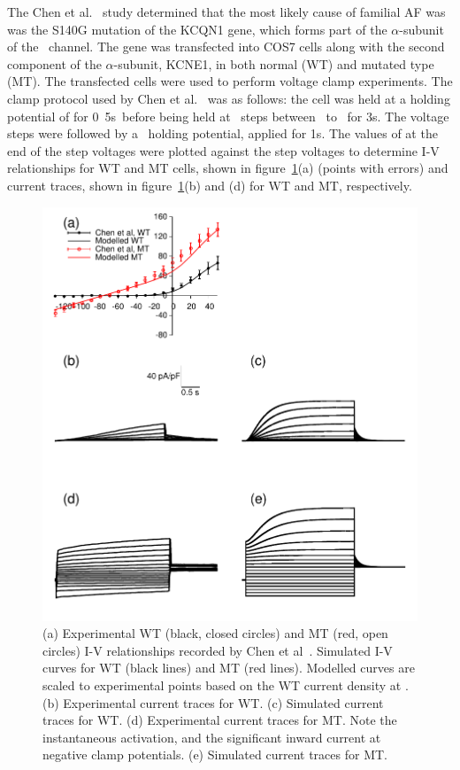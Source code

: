 The Chen et al.~\cite{Chen2003} study determined that the most likely cause of
familial AF was was the S140G mutation of the KCQN1 gene, which forms part of
the $\alpha$-subunit of the \ channel.
The gene was transfected into COS7 cells along with the second component of
the $\alpha$-subunit, KCNE1, in both normal (WT) and mutated type (MT).
The transfected cells were used to perform voltage clamp experiments.
The clamp protocol used by Chen et al.~\cite{Chen2003} was as follows:
the cell was held at a holding potential of  for \unit{0.5}{s}\ before
being held at \ steps between \ to \ for \unit{3}{s}.
The voltage steps were followed by a \ holding potential, applied for
\unit{1}{s}.
The values of  at the end of the step voltages were plotted against the
step voltages to determine  I-V relationships for WT
and MT cells, shown in figure~\ref{atrium:iks:vc}(a) (points with errors) and
current traces, shown in figure~\ref{atrium:iks:vc}(b) and (d) for WT and MT,
respectively.

\begin{figure}
\includegraphics{figures/atrium/iks/figures/01_IV}
\caption[KCNQ1 mutation in IKs, experimental data]{
\label{atrium:iks:vc}
(a) Experimental WT (black, closed circles) and MT (red, open circles)
I-V relationships recorded by Chen et al~\cite{Chen2003}.  Simulated I-V curves for WT (black
lines) and MT (red lines).  Modelled curves are scaled to experimental points
based on the WT current density at .
(b) Experimental current traces for WT.
(c) Simulated current traces for WT.
(d) Experimental current traces for MT.  Note the instantaneous
activation, and the significant inward current at negative clamp potentials.
(e) Simulated current traces for MT.
}
\end{figure}

